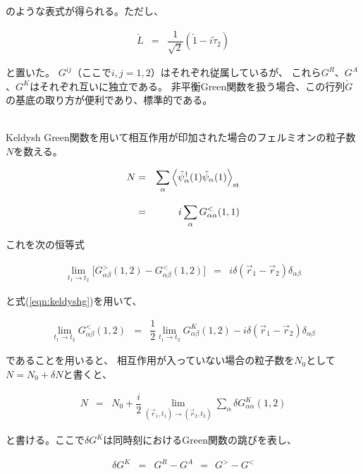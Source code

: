 \documentclass[uplatex,a4j,12pt,dvipdfmx]{jsarticle}
\begin{document}
のような表式が得られる。ただし、

\begin{eqnarray}
	\check{L}
	&=&
	\dfrac{1}{\sqrt{2}}(\check{1} - i \check{\tau}_{2})
\end{eqnarray}

と置いた。
$G^{ij}$（ここで$i,j=1,2$）はそれぞれ従属しているが、
これら$G^{R}$、$G^{A}$、$G^{K}$はそれぞれ互いに独立である。
非平衡Green関数を扱う場合、この行列$\check{G}$の基底の取り方が便利であり、標準的である。


\ \\

Keldysh Green関数を用いて相互作用が印加された場合のフェルミオンの粒子数$N$を数える。

\begin{eqnarray}
	N
	&=&
	\sum_{\alpha} \Big\langle \tilde{\psi}_{\alpha}^{\dagger}(1) \tilde{\psi}_{\alpha}(1) \Big\rangle_{\rm st}
	\nonumber \\[3mm] &=&
	i \sum_{\alpha} G^{<}_{\alpha \alpha}(1,1)
\end{eqnarray}

これを次の恒等式

\begin{eqnarray}
	\lim_{t_{1} \to t_{2}} \Big[ G^{>}_{\alpha \beta}(1,2) - G^{<}_{\alpha \beta}(1,2) \Big]
	&=&
	i \delta(\vec{r}_{1} - \vec{r}_{2}) \delta_{\alpha \beta}
\end{eqnarray}

と式(\ref{eqn:keldyshg})を用いて、

\begin{eqnarray}
	\lim_{t_{1} \to t_{2}}
	G^{<}_{\alpha \beta}(1,2)
	&=&
	\dfrac{1}{2}
	\lim_{t_{1} \to t_{2}}
	G^{K}_{\alpha \beta}(1,2)
	-
	i \delta(\vec{r}_{1} - \vec{r}_{2}) \delta_{\alpha \beta}
\end{eqnarray}

であることを用いると、
相互作用が入っていない場合の粒子数を$N_{0}$として$N=N_{0}+\delta N$と書くと、

\begin{eqnarray}
	N
	&=&
	N_{0} +
	\dfrac{i}{2}
	\lim_{(\vec{r}_{1} ,t_{1}) \to (\vec{r}_{2},t_{2})}
	\sum_{\alpha}
	\delta G^{K}_{\alpha \alpha}(1,2)
\end{eqnarray}

と書ける。ここで$\delta G^{K}$は同時刻におけるGreen関数の跳びを表し、

\begin{eqnarray}
	\delta G^{K}
	&=&
	G^{R} - G^{A}
	\ \ = \ \
	G^{>} - G^{<}
\end{eqnarray}
\end{document}
